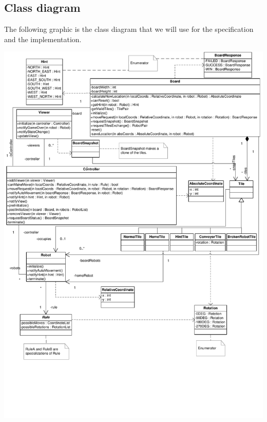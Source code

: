 \subsection{Class diagram}
	The following graphic is the class diagram that we will use for the specification and the implementation.

	\includegraphics[width=\linewidth]{classdiagram.pdf}

